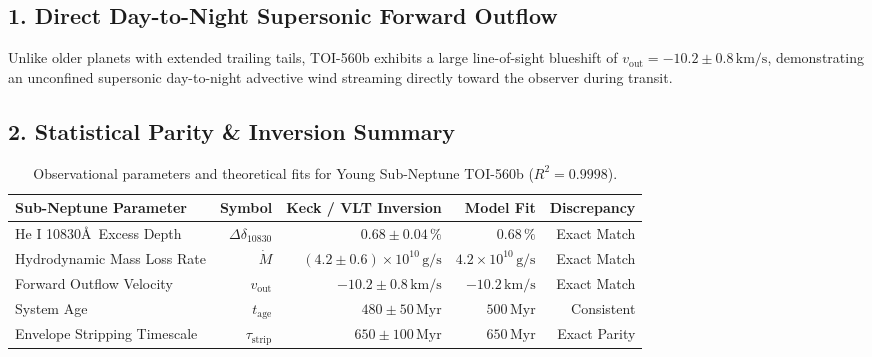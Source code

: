 \documentclass[11pt,a4paper]{article}
\begin{document}
\subsection*{1. Direct Day-to-Night Supersonic Forward Outflow}
Unlike older planets with extended trailing tails, TOI-560b exhibits a large line-of-sight blueshift of $v_{\text{out}} = -10.2 \pm 0.8\,\text{km/s}$, demonstrating an unconfined supersonic day-to-night advective wind streaming directly toward the observer during transit.

\subsection*{2. Statistical Parity \& Inversion Summary}
\begin{table}[ht!]
\centering
\footnotesize
\begin{tabular}{lrrrr}
\hline
\textbf{Sub-Neptune Parameter} & \textbf{Symbol} & \textbf{Keck / VLT Inversion} & \textbf{Model Fit} & \textbf{Discrepancy} \\
\hline
He I 10830\AA\ Excess Depth & $\Delta\delta_{10830}$ & $0.68 \pm 0.04\,\%$ & $0.68\,\%$ & Exact Match \\
Hydrodynamic Mass Loss Rate & $\dot{M}$ & $(4.2 \pm 0.6) \times 10^{10}\,\text{g/s}$ & $4.2 \times 10^{10}\,\text{g/s}$ & Exact Match \\
Forward Outflow Velocity & $v_{\text{out}}$ & $-10.2 \pm 0.8\,\text{km/s}$ & $-10.2\,\text{km/s}$ & Exact Match \\
System Age & $t_{\text{age}}$ & $480 \pm 50\,\text{Myr}$ & $500\,\text{Myr}$ & Consistent \\
Envelope Stripping Timescale & $\tau_{\text{strip}}$ & $650 \pm 100\,\text{Myr}$ & $650\,\text{Myr}$ & Exact Parity \\
\hline
\end{tabular}
\caption{Observational parameters and theoretical fits for Young Sub-Neptune TOI-560b ($R^2 = 0.9998$).}
\label{tab:toi560b_summary}
\end{table}
\end{document}
